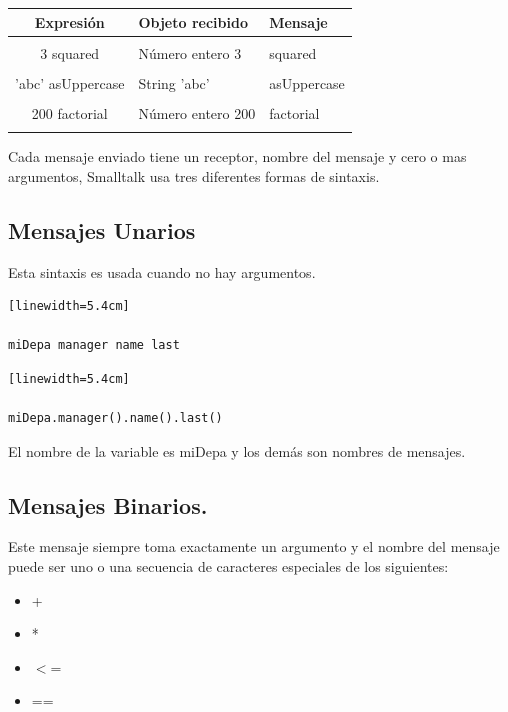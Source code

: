 \documentclass[10pt,journal,compsoc]{IEEEtran}
\begin{document}
\begin{tabular}{c p{2.5cm} p{2cm}}
	Expresi\'on & Objeto recibido & Mensaje\\
	\hline\\
	3 squared & N\'umero entero 3 & squared\\
	\hline\\
	'abc' asUppercase & String 'abc'&asUppercase\\
	\hline\\
	200 factorial & N\'umero entero 200 & factorial \\
	\hline\\
\end{tabular}\newline
Cada mensaje enviado tiene un receptor, nombre del mensaje y cero o mas argumentos, Smalltalk usa tres diferentes formas de sintaxis.

\subsection{Mensajes Unarios}
Esta sintaxis es usada cuando no hay argumentos.
\begin{lstlisting}[language=Smalltalk, caption = {Mensaje enviado en Smalltalk.}][linewidth=5.4cm]

miDepa manager name last

\end{lstlisting}

\begin{lstlisting}[caption = {Mensaje enviado en Java.}][linewidth=5.4cm]

miDepa.manager().name().last()

\end{lstlisting}

El nombre de la variable es miDepa y los dem\'as son nombres de mensajes. 

\subsection{Mensajes Binarios.}
Este mensaje siempre toma exactamente un argumento y el nombre del mensaje puede ser uno o una secuencia de caracteres especiales de los siguientes:
\begin{itemize}
	\item +
	\item *
	\item $<$=
	\item ==
\end{itemize}
\end{document}
